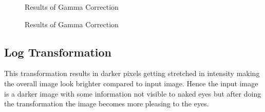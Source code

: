 \documentclass[letterpaper, 10 pt, conference]{ieeeconf}  %
\begin{document}
\begin{figure}[h!]%
	\centering
    \qquad
    \caption{Results of Gamma Correction}%
    \label{fig:gamma_correction1}%
\end{figure}
\begin{figure}[h!]%
	\centering
    \qquad
    \caption{Results of Gamma Correction}%
    \label{fig:gamma_correction2}%
\end{figure}

\subsection{\textbf{Log Transformation}}
This transformation results in darker pixels getting stretched in intensity making the overall image look brighter compared to input image. Hence the input image is a darker image with some information not visible to naked eyes but after doing the transformation the image becomes more pleasing to the eyes. 
\end{document}
